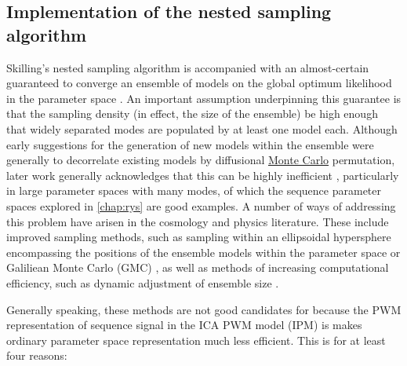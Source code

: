 \documentclass{ut-thesis}
\begin{document}
\begin{NoHyper}
\section{Implementation of the nested sampling algorithm}

Skilling's nested sampling algorithm is accompanied with an almost-certain guaranteed to converge an ensemble of models on the global optimum likelihood in the parameter space \cite{Skilling2006}. An important assumption underpinning this guarantee is that the sampling density (in effect, the size of the ensemble) be high enough that widely separated modes are populated by at least one model each. Although early suggestions for the generation of new models within the ensemble were generally to decorrelate existing models by diffusional \hyperref[ssec:MonteCarlo]{Monte Carlo} permutation, later work generally acknowledges that this can be highly inefficient \cite{Skilling2012}, particularly in large parameter spaces with many modes, of which the sequence parameter spaces explored in \autoref{chap:rys} are good examples. A number of ways of addressing this problem have arisen in the cosmology and physics literature. These include improved sampling methods, such as sampling within an ellipsoidal hypersphere encompassing the positions of the ensemble models within the parameter space \cite{Feroz2008,Feroz2009} or Galiliean Monte Carlo (GMC) \cite{Skilling2012}, as well as methods of increasing computational efficiency, such as dynamic adjustment of ensemble size \cite{Higson2019}. 

Generally speaking, these methods are not good candidates for  because the PWM representation of sequence signal in the ICA PWM model (IPM) is makes ordinary parameter space representation much less efficient. This is for at least four reasons:


\end{NoHyper}
\end{document}
